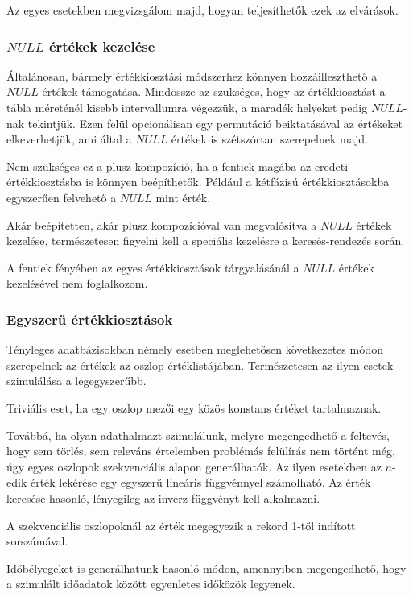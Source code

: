\documentclass[
    parspace,
    noindent,
    nohyp,
]{elteiktdk}[2023/04/10]
\begin{document}
Az egyes esetekben megvizsgálom majd, hogyan teljesíthetők ezek az elvárások.

\subsubsection{$NULL$ értékek kezelése}

Általánosan, bármely értékkiosztási módszerhez könnyen hozzáilleszthető a $NULL$ értékek támogatása.
Mindössze az szükséges, hogy az értékkiosztást a tábla méreténél kisebb intervallumra végezzük,
a maradék helyeket pedig $NULL$-nak tekintjük.
Ezen felül opcionálisan egy permutáció beiktatásával az értékeket elkeverhetjük,
ami által a $NULL$ értékek is szétszórtan szerepelnek majd.

Nem szükséges ez a plusz kompozíció,
ha a fentiek magába az eredeti értékkiosztásba is könnyen beépíthetők.
Például a kétfázisú értékkiosztásokba egyszerűen felvehető a $NULL$ mint érték.

Akár beépítetten, akár plusz kompozícióval van megvalósítva a $NULL$ értékek kezelése,
természetesen figyelni kell a speciális kezelésre a keresés-rendezés során.

A fentiek fényében az egyes értékkiosztások tárgyalásánál a $NULL$ értékek kezelésével nem foglalkozom.

\subsubsection{Egyszerű értékkiosztások}

Tényleges adatbázisokban némely esetben meglehetősen következetes módon
szerepelnek az értékek az oszlop értéklistájában.
Természetesen az ilyen esetek szimulálása a legegyszerűbb.

Triviális eset, ha egy oszlop mezői egy közös konstans értéket tartalmaznak.

Továbbá, ha olyan adathalmazt szimulálunk, melyre megengedhető a feltevés,
hogy sem törlés, sem releváns értelemben problémás felülírás nem történt még,
úgy egyes oszlopok szekvenciális alapon generálhatók.
Az ilyen esetekben az $n$-edik érték lekérése
egy egyszerű lineáris függvénnyel számolható.
Az érték keresése hasonló, lényegileg az inverz függvényt kell alkalmazni.

A szekvenciális oszlopoknál az érték megegyezik a rekord 1-től indított sorszámával.

Időbélyegeket is generálhatunk hasonló módon,
amennyiben megengedhető, hogy a szimulált időadatok között egyenletes időközök legyenek.
\end{document}
